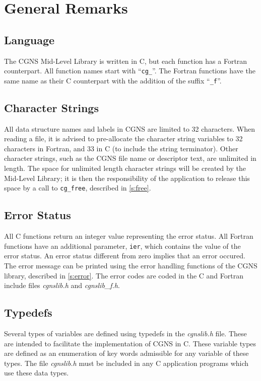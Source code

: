 \section{General Remarks}
\label{s:general}
\thispagestyle{plain}

\subsection{Language}

The CGNS Mid-Level Library is written in C, but each function has a
Fortran counterpart.
All function names start with ``\texttt{cg\_}''.
The Fortran functions have the same name as their C counterpart with the
addition of the suffix ``\texttt{\_f}''.

\subsection{Character Strings}

All data structure names and labels in CGNS are limited to 32
characters.
When reading a file, it is advised to pre-allocate the
character string variables to 32 characters in Fortran, and 33
in C (to include the string terminator).
Other character strings, such as the CGNS file name or
descriptor text, are unlimited in length.
The space for unlimited length character strings will be created by the
Mid-Level Library; it is then the responsibility of the application to
release this space by a call to \texttt{cg\_free}, described in
\autoref{s:free}.

\subsection{Error Status}

All C functions return an integer value representing the error
status.
All Fortran functions have an additional parameter, \texttt{ier},
which contains the value of the error status.
An error status different from zero implies that an error occured.
The error message can be printed using the error
handling functions of the CGNS library, described in \autoref{s:error}.
The error codes are coded in the C and Fortran include files
\textit{cgnslib.h} and \textit{cgnslib\_f.h}.

\subsection{Typedefs}
\label{s:typedefs}

Several types of variables are defined using typedefs in the
\textit{cgnslib.h} file.
These are intended to facilitate the implementation of
CGNS in C.
These variable types are defined as an enumeration of key
words admissible for any variable of these types.
The file \textit{cgnslib.h} must be included in any C application
programs which use these data types.

